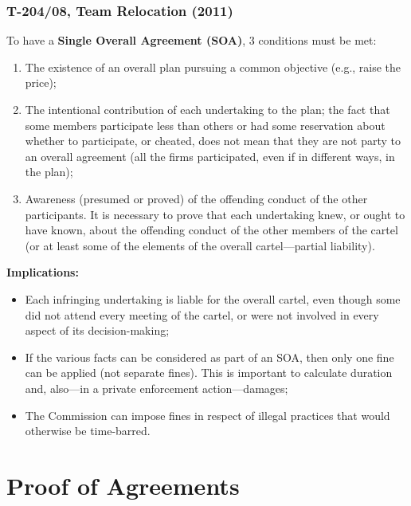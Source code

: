         \subsubsection{T-204/08, Team Relocation (2011)}

            \noindent To have a \textbf{Single Overall Agreement (SOA)}, 3 conditions must be met:

            \begin{enumerate}
                \item The existence of an overall plan pursuing a common objective (e.g., raise the price);
                \item The intentional contribution of each undertaking to the plan; the fact that some members participate less than others or had some reservation about whether to participate, or cheated, does not mean that they are not party to an overall agreement (all the firms participated, even if in different ways, in the plan);
                \item Awareness (presumed or proved) of the offending conduct of the other participants. It is necessary to prove that each undertaking knew, or ought to have known, about the offending conduct of the other members of the cartel (or at least some of the elements of the overall cartel—partial liability).
            \end{enumerate}
            
            \noindent \textbf{Implications:}
            
            \begin{itemize}
                \item Each infringing undertaking is liable for the overall cartel, even though some did not attend every meeting of the cartel, or were not involved in every aspect of its decision-making;
                \item If the various facts can be considered as part of an SOA, then only one fine can be applied (not separate fines). This is important to calculate duration and, also—in a private enforcement action—damages;
                \item The Commission can impose fines in respect of illegal practices that would otherwise be time-barred.
            \end{itemize}
            
\section{Proof of Agreements}

